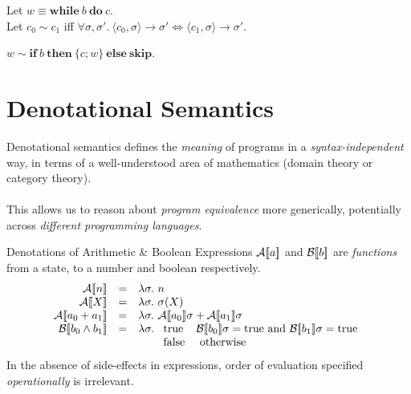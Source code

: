 \begin{frame}
    Let $w \equiv \mathbf{while}\ b\ \mathbf{do}\ c$.\\
    Let $c_0 \sim c_1$ iff $\forall \sigma, \sigma'.\ \langle c_0, \sigma
    \rangle \rightarrow \sigma' \Leftrightarrow \langle c_1, \sigma \rangle
    \rightarrow \sigma'$.
    \begin{theorem}
        $w \sim \mathbf{if}\ b\ \mathbf{then}\ \{c; w\}\ \mathbf{else}\ \mathbf{skip}$.
    \end{theorem}
\end{frame}

\section{Denotational Semantics}

\begin{frame}
    Denotational semantics defines the \emph{meaning} of programs in a
    \emph{syntax-independent} way, in terms of a well-understood area of
    mathematics (domain theory or category theory).\\~\\
    This allows us to reason about \emph{program equivalence} more generically,
    potentially across \emph{different programming languages}.
\end{frame}

\begin{frame}{Denotations of Arithmetic \& Boolean Expressions}
    $\mathcal{A} [\![ a ]\!]$ and $\mathcal{B} [\![ b ]\!]$ are \emph{functions} from a state, to a number and
    boolean respectively.
    \pause
    \[\begin{array}{rcl}
        \denA{n} & = & \lambda \sigma.\ n \\
        \denA{X} & = & \lambda \sigma.\ \sigma(X) \\
        \denA{a_0 + a_1} & = & \lambda \sigma.\ \denA{a_0}\sigma + \denA{a_1}\sigma \\
        \denB{b_0 \wedge b_1} & = &
            \lambda \sigma.\ \begin{array}[t]{ll}
                \mathrm{true} & \denB{b_0}\sigma = \mathrm{true} \text{ and } \denB{b_1}\sigma = \mathrm{true} \\
                \mathrm{false} & \text{ otherwise}
            \end{array}
    \end{array}\]
    \pause
    \alert{In the absence of side-effects in expressions, order of evaluation specified \emph{operationally} is irrelevant.}
\end{frame}

